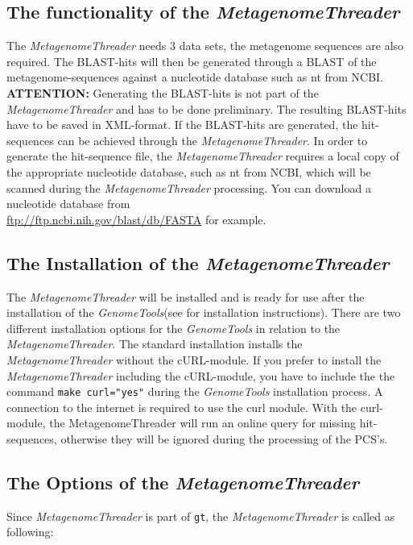 \documentclass[12pt,titlepage]{article}
\newcommand{\MetagenomeThreader}{\textit{MetagenomeThreader}\xspace}
\newcommand{\GenomeTools}{\textit{GenomeTools}\xspace}
\newcommand{\Gt}{\texttt{gt}\xspace}
\newcommand{\Attention}{\textbf{ATTENTION:}\xspace}
\begin{document}
\subsection{The functionality of the \MetagenomeThreader} \label{Functional}

The \MetagenomeThreader needs 3 data sets, the metagenome
sequences are also required. The BLAST-hits will then be generated through a BLAST of
the metagenome-sequences against a nucleotide database such as nt from NCBI.
\Attention Generating the BLAST-hits is not part of the \MetagenomeThreader and
has to be done preliminary. The resulting BLAST-hits have to be saved in XML-format.
If the BLAST-hits are generated, the hit-sequences can be achieved through the
\MetagenomeThreader. In order to generate the hit-sequence file, the \MetagenomeThreader
requires a local copy of the appropriate nucleotide database, such as nt from NCBI, which will be scanned
during the \MetagenomeThreader processing. You can download a nucleotide database
from
\\
{\url{ftp://ftp.ncbi.nih.gov/blast/db/FASTA}} for example.

\subsection{The Installation of the \MetagenomeThreader} \label{Install}

The \MetagenomeThreader will be installed and is ready for use after the
installation of the \GenomeTools (see \cite{genometools} for installation instructions).
There are two different installation options for the \GenomeTools in relation to the \MetagenomeThreader.
The standard installation installs the
\\
\MetagenomeThreader without the cURL-module.
If you prefer to install the \MetagenomeThreader including the cURL-module, you have to include the
the command \texttt{make curl="yes"} during the \GenomeTools installation process.
A connection to the internet is required to use the curl module.
With the curl-module, the MetagenomeThreader will run an online query for
missing hit-sequences, otherwise they will be ignored during the processing of the PCS's.

\subsection{The Options of the \MetagenomeThreader} \label{Overview}

Since \MetagenomeThreader is part of \Gt, the \MetagenomeThreader is called as following:
\end{document}
